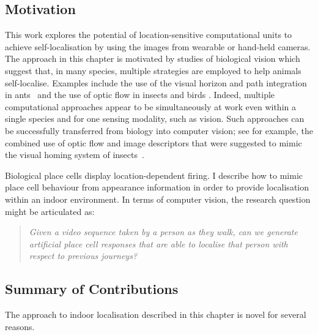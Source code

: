\subsection{Motivation}

This work explores the potential of location-sensitive computational units to achieve self-localisation by using the images from wearable or hand-held cameras.  The approach in this chapter is motivated by studies of biological vision which suggest that, in many species, multiple strategies are employed to help animals self-localise. Examples include the use of the visual horizon and path integration in ants~\cite{narendra2013mapping} and the use of optic flow in insects and birds \cite{krapp2000neuronal, bhagavatula2011optic}. Indeed, multiple computational approaches appear to be simultaneously at work even within a single species and for one sensing modality, such as vision. Such approaches can be successfully transferred from biology into computer vision; see for example, the combined use of optic flow and image descriptors that were suggested to mimic the visual homing system of insects~\cite{vardy2005biologically}.

Biological place cells display location-dependent firing. I describe how to mimic place cell behaviour from appearance information in order to provide localisation within an indoor environment. In terms of computer vision, the research question might be articulated as:

\begin{quotation}\textit{Given a video sequence taken by a person as they walk, can we generate artificial place cell responses that are able to localise that person with respect to previous journeys?
}\end{quotation}


\subsection{Summary of Contributions}

The approach to indoor localisation described in this chapter is novel for several reasons. 

